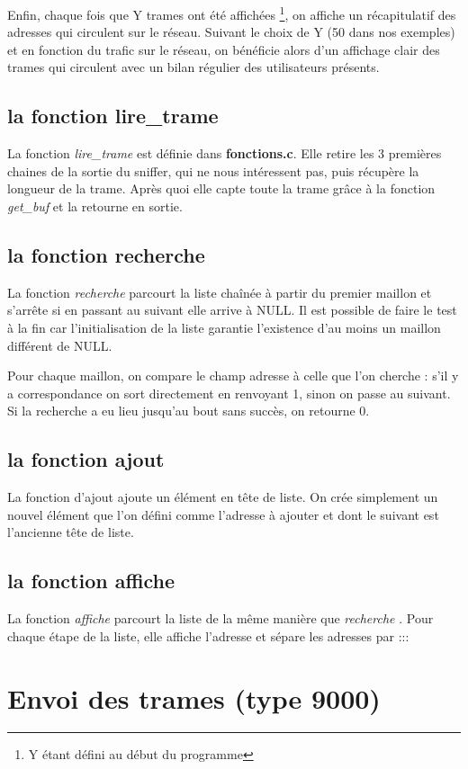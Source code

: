 \documentclass[a4paper,11pt]{article}
\begin{document}
	Enfin, chaque fois que Y trames ont été affichées \footnote{Y étant défini au début du programme}, on affiche un récapitulatif des adresses qui circulent sur le réseau. Suivant le choix de Y (50 dans nos exemples) et en fonction du trafic sur le réseau, on bénéficie alors d'un affichage clair des trames qui circulent avec un bilan régulier des utilisateurs présents. %
	\subsection{la fonction lire\_trame}
	La fonction \textit{lire\_trame} est définie dans \textbf{fonctions.c}. Elle retire les 3 premières chaines de la sortie du sniffer, qui ne nous intéressent pas, puis récupère la longueur de la trame. Après quoi elle capte toute la trame grâce à la fonction \textit{get\_buf} et la retourne en sortie.
	\subsection{la fonction recherche}
	La fonction \textit{ recherche} parcourt la liste chaînée à partir du premier maillon et s'arrête si en passant au suivant elle arrive à NULL. Il est possible de faire le test à la fin car l'initialisation de la liste garantie l'existence d'au moins un maillon différent de NULL.

	Pour chaque maillon, on compare le champ adresse à celle que l'on cherche : s'il y a correspondance on sort directement en renvoyant 1, sinon on passe au suivant. Si la recherche a eu lieu jusqu'au bout sans succès, on retourne 0.
	\subsection{la fonction ajout}
	La fonction d'ajout ajoute un élément en tête de liste. On crée simplement un nouvel élément que l'on défini comme l'adresse à ajouter et dont le suivant est l'ancienne tête de liste.
	\subsection{la fonction affiche}
	La fonction  \textit{affiche} parcourt la liste de la même manière que  \textit{recherche} . Pour chaque étape de la liste, elle affiche l'adresse et sépare les adresses par :::
	\section{Envoi des trames (type 9000)}
\end{document}
